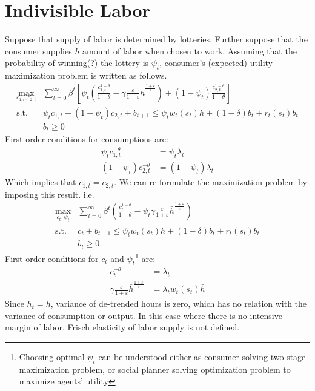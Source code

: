 \documentclass[12pt]{amsart}
\begin{document}
\section{Indivisible Labor}
Suppose that supply of labor is determined by lotteries. Further suppose that the consumer supplies $\bar{h}$ amount of labor when chosen to work. Assuming that the probability of winning(?) the lottery is $\psi_t$, consumer's (expected) utility maximization problem is written as follows. 
\begin{align*}
\max_{c_{1,t}, c_{2,t}} &\sum_{t = 0}^{\infty} \beta^t \left[   \psi_t \left( \frac{c_{1,t}^{1-\theta}}{1-\theta}  - \gamma \frac{\varepsilon}{1+\varepsilon} \bar{h}^{\frac{1+\varepsilon}{\varepsilon}} \right) + (1-\psi_t) \frac{c_{2,t}^{1-\theta}}{1-\theta} \right] \\
\text{s.t. } & \psi_t c_{1,t} + (1-\psi_t) c_{2,t} + b_{t+1} \leq \psi_t w_t(s_t) \bar{h} + (1-\delta) b_{t} + r_t(s_t) b_{t} \\
& b_t \geq 0
\end{align*}
First order conditions for consumptions are: 
\begin{align*}
\psi_t c_{1,t}^{-\theta} &= \psi_t \lambda_t \\
(1-\psi_t) c_{2,t}^{-\theta} &= (1-\psi_t) \lambda_t 
\end{align*}
Which implies that $c_{1,t} = c_{2,t}$. We can re-formulate the maximization problem by imposing this result. i.e.
\begin{align*}
\max_{c_t, \psi_t} &\sum_{t = 0}^{\infty} \beta^t   \left(  \frac{c_{t}^{1-\theta}}{1-\theta}  - \psi_t \gamma \frac{\varepsilon}{1+\varepsilon} \bar{h}^{\frac{1+\varepsilon}{\varepsilon}} \right)  \\
\text{s.t. } & c_t + b_{t+1} \leq \psi_t w_t(s_t) \bar{h} + (1-\delta) b_{t} + r_t(s_t) b_{t} \\
& b_t \geq 0
\end{align*}
First order conditions for $c_t$ and $\psi_t$\footnote{Choosing optimal $\psi_t$ can be understood either as consumer solving two-stage maximization problem, or social planner solving optimization problem to maximize agents' utility} are: 
\begin{align*}
c_t^{-\theta} &= \lambda_t \\
\gamma \frac{\varepsilon}{1+\varepsilon} \bar{h}^{\frac{1+\varepsilon}{\varepsilon}} &= \lambda_t w_t(s_t) \bar{h}
\end{align*}
Since $h_t = \bar{h}$, variance of de-trended hours is zero, which has no relation with the variance of consumption or output. In this case where there is no intensive margin of labor, Frisch elasticity of labor supply is not defined. 
\end{document}
